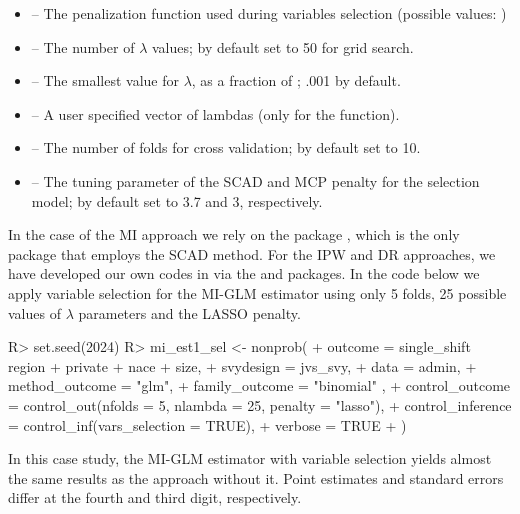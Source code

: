 \documentclass[
]{jss}
\begin{document}
\begin{itemize}
\item {} -- The penalization function used during variables selection (possible values: )
\item {} -- The number of $\lambda$ values; by default set to 50 for grid search.
\item {} -- The smallest value for $\lambda$, as a fraction of ; .001 by default.
\item {} -- A user specified vector of lambdas (only for the  function).
\item {} -- The number of folds for cross validation; by default set to 10.
\item {} -- The tuning parameter of the SCAD and MCP penalty for the selection model; by default set to 3.7 and 3, respectively.
\end{itemize}

In the case of the MI approach we rely on the  package
\citep{ncvreg}, which is the only  package that employs the
SCAD method. For the IPW and DR approaches, we have developed our own
codes in  via the  and 
packages. In the code below we apply variable selection for the MI-GLM
estimator using only 5 folds, 25 possible values of \(\lambda\)
parameters and the LASSO penalty.

\begin{CodeChunk}
\begin{CodeInput}
R> set.seed(2024)
R> mi_est1_sel <- nonprob(
+   outcome = single_shift ~ region + private + nace + size,
+   svydesign = jvs_svy,
+   data = admin,
+   method_outcome = "glm",
+   family_outcome = "binomial" ,
+   control_outcome = control_out(nfolds = 5, nlambda = 25, penalty = "lasso"),
+   control_inference = control_inf(vars_selection = TRUE),
+   verbose = TRUE
+ )
\end{CodeInput}
\end{CodeChunk}

In this case study, the MI-GLM estimator with variable selection yields
almost the same results as the approach without it. Point estimates and
standard errors differ at the fourth and third digit, respectively.
\end{document}
